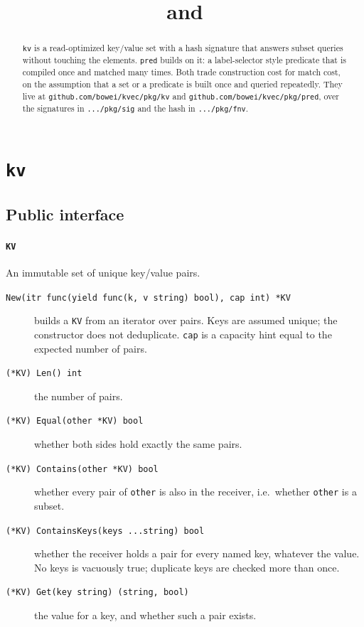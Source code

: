 \documentclass[11pt]{article}
\title{\code{kv} and \code{pred}}
\author{}
\date{}
\newcommand{\code}[1]{\texttt{#1}}
\begin{document}
\maketitle

\begin{abstract}
\code{kv} is a read-optimized key/value set with a hash signature that answers
subset queries without touching the elements. \code{pred} builds on it: a
label-selector style predicate that is compiled once and matched many times.
Both trade construction cost for match cost, on the assumption that a set or a
predicate is built once and queried repeatedly. They live at
\code{github.com/bowei/kvec/pkg/kv} and \code{github.com/bowei/kvec/pkg/pred},
over the signatures in \code{.../pkg/sig} and the hash in \code{.../pkg/fnv}.
\end{abstract}

\section{\code{kv}}

\subsection{Public interface}

\paragraph{\code{KV}} An immutable set of unique key/value pairs.

\begin{description}
  \item[\code{New(itr func(yield func(k, v string) bool), cap int) *KV}]
    builds a \code{KV} from an iterator over pairs. Keys are assumed unique;
    the constructor does not deduplicate. \code{cap} is a capacity hint equal to
    the expected number of pairs.
  \item[\code{(*KV) Len() int}] the number of pairs.
  \item[\code{(*KV) Equal(other *KV) bool}] whether both sides hold exactly the
    same pairs.
  \item[\code{(*KV) Contains(other *KV) bool}] whether every pair of
    \code{other} is also in the receiver, i.e.\ whether \code{other} is a subset.
  \item[\code{(*KV) ContainsKeys(keys ...string) bool}] whether the receiver
    holds a pair for every named key, whatever the value. No keys is vacuously
    true; duplicate keys are checked more than once.
  \item[\code{(*KV) Get(key string) (string, bool)}] the value for a key, and
    whether such a pair exists.
\end{description}
\end{document}
